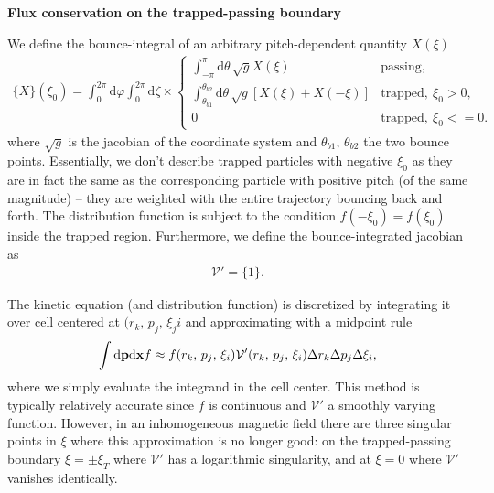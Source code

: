\documentclass[11pt,a4paper]{article}
\newcommand{\rd}{\ensuremath{\mathrm{d}}}
\renewcommand{\b}[1]{\ensuremath{ {\bf #1 } }}
\begin{document}
\begin{center}
\Large \bf Flux conservation on the trapped-passing boundary
\end{center}
We define the bounce-integral of an arbitrary pitch-dependent quantity $X(\xi)$ 
\begin{align}
\{ X \}(\xi_0) = \int_0^{2\pi} \rd \varphi \int_0^{2\pi}\rd \zeta \times \begin{cases}
\int_{-\pi}^\pi \rd \theta \, \sqrt{g}X(\xi) & \text{passing}, \\
\int_{\theta_{b1}}^{\theta_{b2}} \rd \theta \, \sqrt{g}[X(\xi) + X(-\xi)]  & \text{trapped}, ~ \xi_0>0, \\
0 & \text{trapped}, ~ \xi_0<=0.
\end{cases}
\end{align}
where $\sqrt{g}$ is the jacobian of the coordinate system and $\theta_{b1},\,\theta_{b2}$ the two bounce points. Essentially, we don't describe trapped particles with negative $\xi_0$ as they are in fact the same as the corresponding particle with positive pitch (of the same magnitude) -- they are weighted with the entire trajectory bouncing back and forth. The distribution function is subject to the condition $f(-\xi_0) = f(\xi_0)$ inside the trapped region.
Furthermore, we define the bounce-integrated jacobian as
\begin{align}
\mathcal{V}' = \{1\}.
\end{align}

The kinetic equation (and distribution function) is discretized by integrating it over cell centered at $(r_k,\,p_j,\,\xi_ji$ and approximating with a midpoint rule
\begin{align}
\int \rd \b{p} \rd \b{x}  f \approx f(r_k,\,p_j,\,\xi_i) \mathcal{V}'(r_k,\,p_j,\,\xi_i) \Delta r_k \Delta p_j \Delta \xi_i,
\end{align}
where we simply evaluate the integrand in the cell center.
This method is typically relatively accurate since $f$ is continuous and $\mathcal{V}'$ a smoothly varying function. However, in an inhomogeneous magnetic field there are three singular points in $\xi$ where this approximation is no longer good: on the trapped-passing boundary $\xi=\pm \xi_T$ where $\mathcal{V}'$ has a logarithmic singularity, and at $\xi=0$ where $\mathcal{V}'$ vanishes identically.
\end{document}
